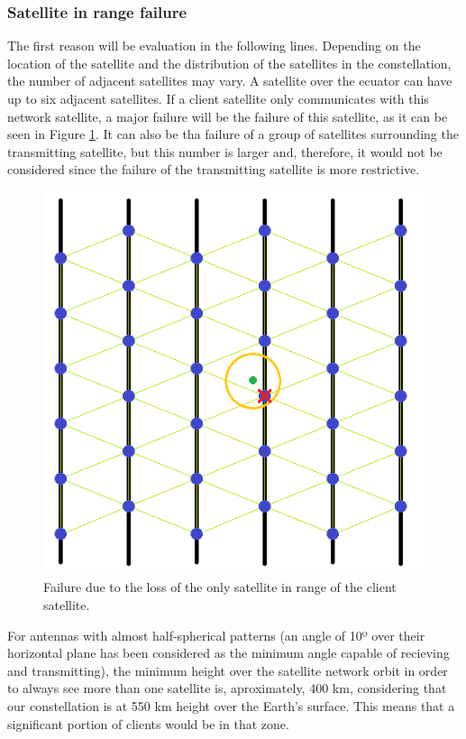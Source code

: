 \subsubsection{Satellite in range failure}
The first reason will be evaluation in the following lines. Depending on the location of the satellite and the distribution of the satellites in the constellation, the number of adjacent satellites may vary. A satellite over the ecuator can have up to six adjacent satellites. If a client satellite only communicates with this network satellite, a major failure will be the failure of this satellite, as it can be seen in Figure \ref{fig:critical1}. It can also be tha failure of a group of satellites surrounding the transmitting satellite, but this number is larger and, therefore, it would not be considered since the failure of the transmitting satellite is more restrictive.

\begin{figure}[H]
\begin{center}
\includegraphics[scale=0.5]{critical1.PNG}
\caption[1 communication range failure]{Failure due to the loss of the only satellite in range of the client satellite.}
\label{fig:critical1}
\end{center}
\end{figure}

For antennas with almost half-spherical patterns (an angle of 10º over their horizontal plane has been considered as the minimum angle capable of recieving and transmitting), the minimum height over the satellite network orbit in order to always see more than one satellite is, aproximately, 400 km, considering that our constellation is at 550 km height over the Earth's surface. This means that a significant portion of clients would be in that zone.

